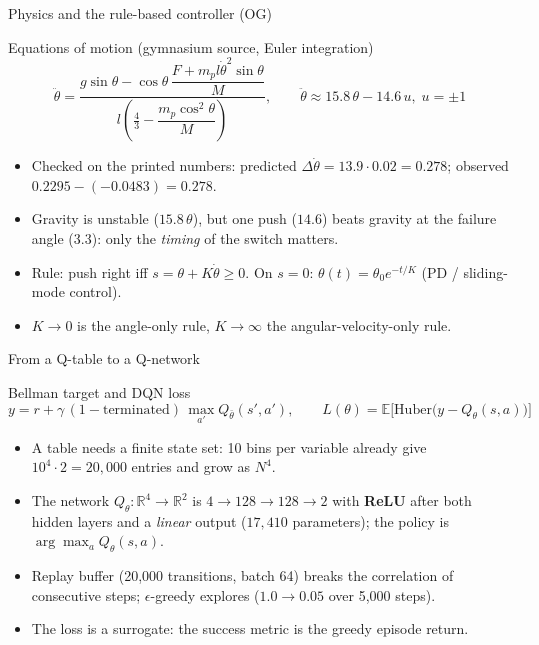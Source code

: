 \documentclass[aspectratio=169]{beamer}
\begin{document}
\begin{frame}{Physics and the rule-based controller (OG)}
\begin{block}{Equations of motion (gymnasium source, Euler integration)}
\[
\ddot\theta=\frac{g\sin\theta-\cos\theta\,\dfrac{F+m_p l\dot\theta^2\sin\theta}{M}}{l\left(\frac43-\dfrac{m_p\cos^2\theta}{M}\right)},\qquad
\ddot\theta\approx 15.8\,\theta-14.6\,u,\; u=\pm1
\]
\end{block}
\begin{itemize}
  \item Checked on the printed numbers: predicted $\Delta\dot\theta=13.9\cdot0.02=0.278$; observed $0.2295-(-0.0483)=0.278$.
  \item Gravity is unstable ($15.8\,\theta$), but one push ($14.6$) beats gravity at the failure angle ($3.3$): only the \emph{timing} of the switch matters.
  \item Rule: push right iff $s=\theta+K\dot\theta\ge0$. On $s=0$: $\theta(t)=\theta_0e^{-t/K}$ (PD / sliding-mode control).
  \item $K\to0$ is the angle-only rule, $K\to\infty$ the angular-velocity-only rule.
\end{itemize}
\end{frame}

\begin{frame}{From a Q-table to a Q-network}
\begin{block}{Bellman target and DQN loss}
\[
y=r+\gamma\,(1-\text{terminated})\,\max_{a'}Q_{\bar\theta}(s',a'),\qquad
L(\theta)=\mathbb{E}\big[\mathrm{Huber}\big(y-Q_\theta(s,a)\big)\big]
\]
\end{block}
\begin{itemize}
  \item A table needs a finite state set: 10 bins per variable already give $10^4\cdot2=20{,}000$ entries and grow as $N^4$.
  \item The network $Q_\theta:\mathbb{R}^4\to\mathbb{R}^2$ is $4\to128\to128\to2$ with \textbf{ReLU} after both hidden layers and a \emph{linear} output ($17{,}410$ parameters); the policy is $\arg\max_a Q_\theta(s,a)$.
  \item Replay buffer (20,000 transitions, batch 64) breaks the correlation of consecutive steps; $\epsilon$-greedy explores ($1.0\to0.05$ over 5,000 steps).
  \item The \alert{loss is a surrogate}: the success metric is the greedy episode return.
\end{itemize}
\end{frame}
\end{document}
